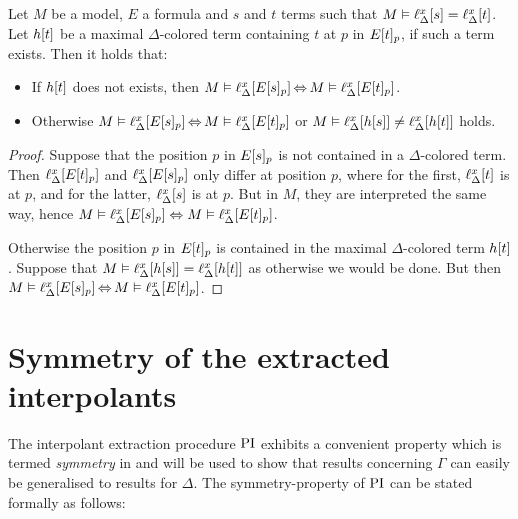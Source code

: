 \begin{lemma}
	\label{aga5tg5ba}
	Let $M$ be a model, $E$ a formula and $s$ and $t$ terms such that
	$M \vDash \ell_{\Delta}^{x}[s] = \ell_{\Delta}^{x}[t]$.
	Let $h[t]$ be a maximal $\Delta$-colored term containing $t$ at $p$ in $E{[t]_{p}}$, if such a term exists. Then it holds that:
	\begin{itemize}
		\item If $h[t]$ does not exists, then
			$M\vDash \ell_{\Delta}^{x}[E{[s]_{p}}] \operatorname{\Leftrightarrow} M \vDash \ell_{\Delta}^{x}[E{[t]_{p}}]$.
		\item Otherwise
			$M\vDash \ell_{\Delta}^{x}[E{[s]_{p}}] \operatorname{\Leftrightarrow} M \vDash \ell_{\Delta}^{x}[E{[t]_{p}}]$
			or $M\vDash \ell_{\Delta}^{x}[h[s]] \neq \ell_{\Delta}^{x}[h[t]]$ holds.
	\end{itemize}
\end{lemma}
\begin{proof} 
	Suppose that the position $p$ in $E{[s]_{p}}$ is not contained in a $\Delta$-colored term.
	Then $\ell_{\Delta}^{x}[E{[t]_{p}}]$ and $\ell_{\Delta}^{x}[E{[s]_{p}}]$ only differ at position $p$,
	where for the first, $\ell_{\Delta}^{x}[t]$ is at $p$, and for the latter, $\ell_{\Delta}^{x}[s]$ is at $p$.
	But in $M$, they are interpreted the same way, hence $M\entails\nolinebreak \lifdelta{E\occurat{s}{p}} \spas\semiff M \entails \lifdelta{E\occurat{t}{p}}$.

	Otherwise the position $p$ in $E{[t]_{p}}$ is contained in the maximal $\Delta$-colored term $h[t]$.
	Suppose that $M\vDash \ell_{\Delta}^{x}[h[s]]  = \ell_{\Delta}^{x}[h[t]]$ as otherwise we would be done.
	But then $M \entails\nolinebreak \lifdelta{E\occurat{s}{p}} \semiff{} M\entails \lifdelta{E\occurat{t}{p}}$.
\end{proof} 



\section{Symmetry of the extracted interpolants}


The interpolant extraction procedure $\operatorname{PI}$ exhibits a convenient property which is termed \emph{symmetry} in \cite[Definition 5]{interpolantStrenth} and will be used to show that results concerning $\Gamma$ can easily be generalised to results for $\Delta$.
The symmetry-property of $\operatorname{PI}$ can be stated formally as follows:

